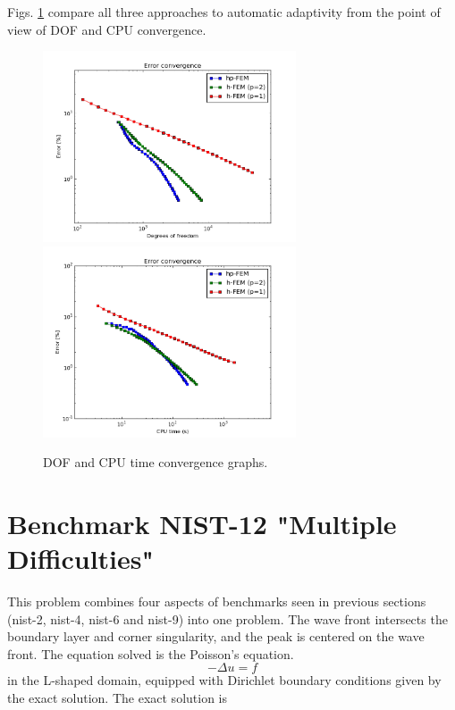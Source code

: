 \documentclass[12pt]{elsarticle}
\begin{document}
Figs. \ref{fig:nist-11-conv} compare all
three approaches to automatic adaptivity from the point
of view of DOF and CPU convergence.

\begin{figure}[H]
\centering
\hspace{-50mm}
\includegraphics[width=7.5cm]{nist/nist-11/conv_dof_aniso.png}\ \
\hspace{-10mm}
\includegraphics[width=7.5cm]{nist/nist-11/conv_cpu_aniso.png}
\hspace{-50mm}
\caption{DOF and CPU time convergence graphs.}
\label{fig:nist-11-conv}
\end{figure}


\section{Benchmark NIST-12 "Multiple Difficulties"}
\label{sec:bench-12}

This problem combines four aspects of benchmarks
seen in previous sections (nist-2, nist-4, nist-6 and nist-9) into one problem.
The wave front intersects the boundary
layer and corner singularity, and the peak is centered on the wave front.
The equation solved is the Poisson's equation.
\vspace{-3mm}
\begin{equation} \label{multiple}
-\Delta u = f
\end{equation}
in the L-shaped domain, equipped with Dirichlet boundary conditions
given by the exact solution.
The exact solution is
\end{document}
